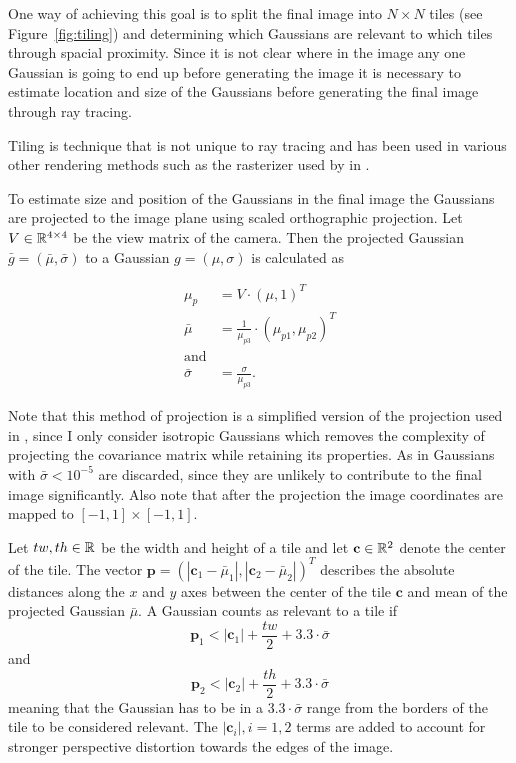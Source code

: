 \documentclass[a4paper, 11pt]{memoir}
\begin{document}
    One way of achieving this goal is to split the final image into $N \times N$ tiles (see Figure~\ref{fig:tiling})
    and determining which Gaussians are relevant to which tiles through spacial proximity. Since it is not clear where
    in the image any one Gaussian is going to end up before generating the image it is necessary to estimate location
    and size of the Gaussians before generating the final image through ray tracing.

    Tiling is technique that is not unique to ray tracing and has been used in various other rendering methods such as
    the rasterizer used by \citeauthor{kerbl3Dgaussians} in \cite{kerbl3Dgaussians}.

    To estimate size and position of the Gaussians in the final image the Gaussians are projected to the image plane
    using scaled orthographic projection. Let $V \in \mathbb{R}^{4 \times 4}$ be the view matrix of the camera. Then the
    projected Gaussian $\bar{g} = (\bar{\mu}, \bar{\sigma})$ to a Gaussian $g = (\mu, \sigma)$ is calculated as

    \begin{align}
        \mu_p &= V \cdot (\mu, 1)^T\\
        \bar{\mu} &= \frac{1}{\mu_{p3}} \cdot (\mu_{p1}, \mu_{p2})^T \label{eq:tiling_projection}\\
        \text{and}\nonumber\\
        \bar{\sigma} &= \frac{\sigma}{\mu_{p3}}.
        \label{eq:tiling_scale}
    \end{align}

    Note that this method of projection is a simplified version of the projection used in \cite{kerbl3Dgaussians},
    since I only consider isotropic Gaussians which removes the complexity of projecting the covariance matrix while
    retaining its properties. As in \cite{Rhodin:2015} Gaussians with $\bar{\sigma} < 10^{-5}$ are discarded, since
    they are unlikely to contribute to the final image significantly. Also note that after the projection the image
    coordinates are mapped to $[-1, 1] \times [-1, 1]$.

    Let $tw, th \in \mathbb{R}$ be the width and height of a tile and let $\mathbf{c} \in \mathbb{R}^2$ denote the center of the tile.
    The vector $\mathbf{p} = (|\mathbf{c}_1 - \bar{\mu}_1|, |\mathbf{c}_2 - \bar{\mu}_2|)^T$ describes the absolute
    distances along the $x$ and $y$ axes between the center of the tile $\mathbf{c}$ and mean of the projected
    Gaussian $\bar{\mu}$. A Gaussian counts as relevant to a tile if
    \begin{equation}
        \mathbf{p}_1 < |\mathbf{c}_1| + \frac{tw}{2} + 3.3\cdot\bar{\sigma}
        \label{eq:tiling_cond_1}
    \end{equation}
    and 
    \begin{equation}
        \mathbf{p}_2 < |\mathbf{c}_2| + \frac{th}{2} + 3.3\cdot\bar{\sigma}
        \label{eq:tiling_cond_2}
    \end{equation}
    meaning that the Gaussian has to be in a $3.3 \cdot \bar{\sigma}$ range from the borders of the tile to be
    considered relevant. The $|\mathbf{c}_i|, i=1,2$ terms are added to account for stronger perspective distortion
    towards the edges of the image.
\end{document}
